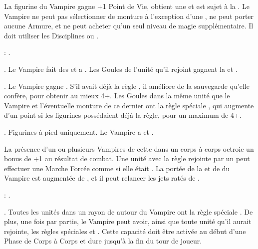 La figurine du Vampire \strigoi{} gagne +1 Point de Vie, obtient une  et est sujet à la \hatred{}. Le Vampire ne peut pas sélectionner de monture à l'exception d'une \shriekinghorror{}, ne peut porter aucune Armure, et ne peut acheter qu'un seul niveau de magie supplémentaire. Il doit utiliser les Disciplines \wilderness{} ou \necromancy{}.

\bloodties{}: \ghouls{}.

\startpricelist

 \textbf{\ancientbloodpower}. Le Vampire fait des \poisonedattacks{} et a . Les Goules de l'unité qu'il rejoint gagnent la \hatred{} et .

 \textbf{\bloodlinepower}. Le Vampire gagne . S'il avait déjà la règle \regeneration{}, il améliore de  la sauvegarde qu'elle confère, pour obtenir au mieux 4+. Les Goules dans la même unité que le Vampire et l'éventuelle monture de ce dernier ont la règle spéciale , qui augmente d'un point si les figurines possédaient déjà la règle, pour un maximum de 4+.

 \textbf{\bloodlinepower}. Figurines à pied uniquement. Le Vampire a \thunderouscharge{} et .

\endpricelist

\separator

La présence d'un ou plusieurs Vampires de cette \bloodline{} dans un corps à corps octroie un bonus de +1 au résultat de combat. Une unité avec la règle \undead{} rejointe par un \vonkarnstein{} peut effectuer une Marche Forcée comme si elle était \vampiric{}. La portée de la \inspiringpresence{} et de \holdyourground{} du Vampire est augmentée de , et il peut relancer les jets ratés de \vampiric{}. 

\bloodties{}: \darkcoach .

\startpricelist

 \textbf{\ancientbloodpower}.  Toutes les unités dans un rayon de  autour du Vampire ont la règle spéciale \blurry . De plus, une fois par partie, le Vampire peut avoir, ainsi que toute unité qu'il aurait rejointe, les règles spéciales \lightningattacks{} et . Cette capacité doit être activée au début d'une Phase de Corps à Corps et dure jusqu'à la fin du tour de joueur.

